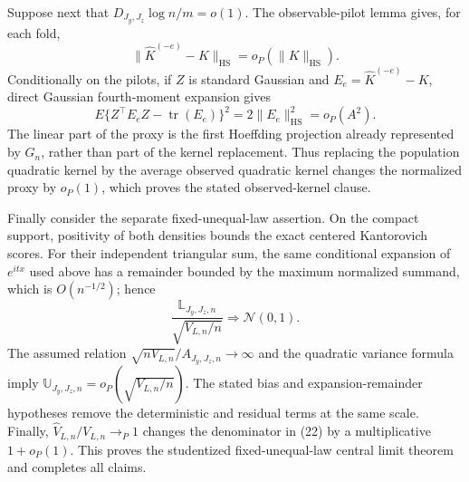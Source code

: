 Suppose next that \(D_{J_y,J_z}\log n/m=o(1)\).  The observable-pilot lemma gives, for each fold,
\[
\|\widehat K^{(-e)}-K\|_{\mathrm{HS}}=o_P(\|K\|_{\mathrm{HS}}).
\]
Conditionally on the pilots, if \(Z\) is standard Gaussian and \(E_e=\widehat K^{(-e)}-K\), direct Gaussian fourth-moment expansion gives
\[
E\{Z^\top E_eZ-\operatorname{tr}(E_e)\}^2=2\|E_e\|_{\mathrm{HS}}^2=o_P(A^2). \tag{21}
\]
The linear part of the proxy is the first Hoeffding projection already represented by \(G_n\), rather than part of the kernel replacement.  Thus replacing the population quadratic kernel by the average observed quadratic kernel changes the normalized proxy by \(o_P(1)\), which proves the stated observed-kernel clause.

Finally consider the separate fixed-unequal-law assertion.  On the compact support, positivity of both densities bounds the exact centered Kantorovich scores.  For their independent triangular sum, the same conditional expansion of \(e^{itx}\) used above has a remainder bounded by the maximum normalized summand, which is \(O(n^{-1/2})\); hence
\[
\frac{\mathbb L_{J_y,J_z,n}}{\sqrt{V_{L,n}/n}}\Rightarrow\mathcal N(0,1). \tag{22}
\]
The assumed relation \(\sqrt{nV_{L,n}}/A_{J_y,J_z,n}\to\infty\) and the quadratic variance formula imply \(\mathbb U_{J_y,J_z,n}=o_P(\sqrt{V_{L,n}/n})\).  The stated bias and expansion-remainder hypotheses remove the deterministic and residual terms at the same scale.  Finally, \(\widehat V_{L,n}/V_{L,n}\to_P1\) changes the denominator in (22) by a multiplicative \(1+o_P(1)\).  This proves the studentized fixed-unequal-law central limit theorem and completes all claims.